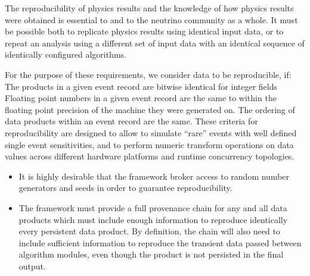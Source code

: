 \documentclass[../main-v1.tex]{subfiles}
\begin{document}
The reproducibility of physics results and the knowledge of how physics results were obtained is essential to  and to the neutrino community as a whole.  It must be possible both to replicate physics results using identical input data, or to repeat an analysis using a different set of input data with an identical sequence of identically configured algorithms. 


For the purpose of these requirements, we consider data to be reproducible, if:
The products in a given event record are bitwise identical for integer fields
Floating point numbers in a given event record are the same to within the floating point precision of the machine they were generated on.
The ordering of data products within an event record are the same.
These criteria for reproducibility are designed to allow  to simulate “rare” events with well defined single event sensitivities, and to perform numeric transform operations on data values across different hardware platforms and runtime concurrency topologies.
\begin{itemize}


\item It is highly desirable that the framework broker access to random number generators and seeds in order to guarantee reproducibility.  


\item The framework must provide a full provenance chain for any and all data products which must include enough information to reproduce identically every persistent data product.  By definition, the chain will also need to include sufficient information to reproduce the transient data passed between algorithm modules, even though the product is not persisted in the final output.  
\end{itemize}
\end{document}
